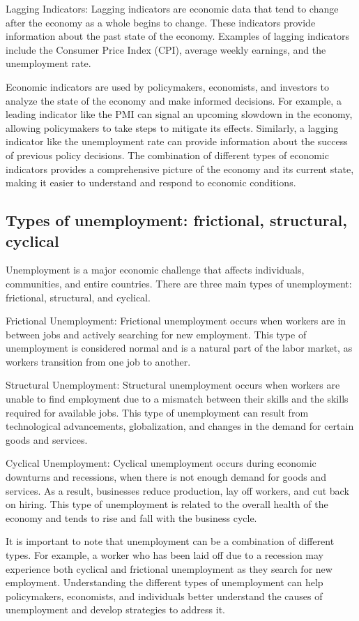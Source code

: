 \documentclass[12pt, a4paper, oneside]{article}
\begin{document}
Lagging Indicators: Lagging indicators are economic data that tend to change after the economy as a whole begins to change. These indicators provide information about the past state of the economy. Examples of lagging indicators include the Consumer Price Index (CPI), average weekly earnings, and the unemployment rate.

Economic indicators are used by policymakers, economists, and investors to analyze the state of the economy and make informed decisions. For example, a leading indicator like the PMI can signal an upcoming slowdown in the economy, allowing policymakers to take steps to mitigate its effects. Similarly, a lagging indicator like the unemployment rate can provide information about the success of previous policy decisions. The combination of different types of economic indicators provides a comprehensive picture of the economy and its current state, making it easier to understand and respond to economic conditions.
\subsection{ Types of unemployment: frictional, structural, cyclical }
Unemployment is a major economic challenge that affects individuals, communities, and entire countries. There are three main types of unemployment: frictional, structural, and cyclical.

Frictional Unemployment: Frictional unemployment occurs when workers are in between jobs and actively searching for new employment. This type of unemployment is considered normal and is a natural part of the labor market, as workers transition from one job to another.

Structural Unemployment: Structural unemployment occurs when workers are unable to find employment due to a mismatch between their skills and the skills required for available jobs. This type of unemployment can result from technological advancements, globalization, and changes in the demand for certain goods and services.

Cyclical Unemployment: Cyclical unemployment occurs during economic downturns and recessions, when there is not enough demand for goods and services. As a result, businesses reduce production, lay off workers, and cut back on hiring. This type of unemployment is related to the overall health of the economy and tends to rise and fall with the business cycle.

It is important to note that unemployment can be a combination of different types. For example, a worker who has been laid off due to a recession may experience both cyclical and frictional unemployment as they search for new employment. Understanding the different types of unemployment can help policymakers, economists, and individuals better understand the causes of unemployment and develop strategies to address it.
\end{document}
